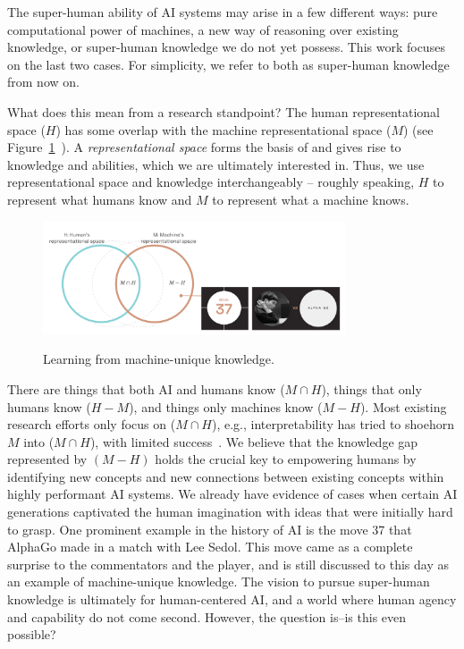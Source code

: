 \documentclass{article}
\begin{document}
The super-human ability of AI systems may arise in a few different ways: pure computational power of machines, a new way of reasoning over existing knowledge, or super-human knowledge we do not yet possess. This work focuses on the last two cases. For simplicity, we refer to both as super-human knowledge from now on.  

What does this mean from a research standpoint? The human representational space ($H$) has some overlap with the machine representational space ($M$) (see Figure~\ref{fig:m_minus_h}~\citep{iclrkeynote_been_2022}). A \textit{representational space } forms the basis of and gives rise to knowledge and abilities, which we are ultimately interested in. Thus, we use representational space and knowledge interchangeably -- roughly speaking, $H$ to represent what humans know and $M$ to represent what a machine knows. 
\begin{figure}[ht] 
\centering
\caption{Learning from machine-unique knowledge.}
\includegraphics[width=0.8\textwidth]{images/m-hset.png}
\label{fig:m_minus_h}
\end{figure}
There are things that both AI and humans know ($M \cap H$), things that only humans know ($H - M$), and things only machines know ($M - H$). Most existing research efforts only focus on ($M \cap H$), e.g., interpretability has tried to shoehorn $M$ into ($M \cap H$), with limited success~\citep{adebayo2018sanity, nie2018,  bilodeau22impossibility}. We believe that the knowledge gap represented by $(M - H)$ holds the crucial key to empowering humans by identifying new concepts and new connections between existing concepts within highly performant AI systems. We already have evidence of cases when certain AI generations captivated the human imagination with ideas that were initially hard to grasp. One prominent example in the history of AI is the move 37 that AlphaGo made in a match with Lee Sedol. This move came as a complete surprise to the commentators and the player, and is still discussed to this day as an example of machine-unique knowledge. 
The vision to pursue super-human knowledge is ultimately for human-centered AI, and a world where human agency and capability do not come second. 
However, the question is--is this even possible?  
\end{document}
